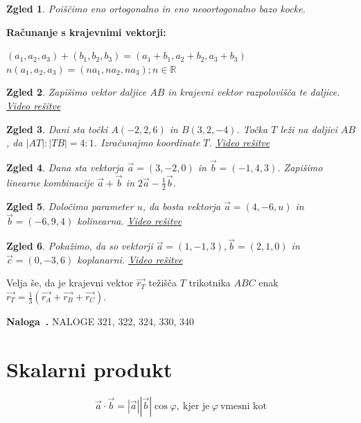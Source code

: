 \documentclass{article}
\newcounter{example}[section]
\newenvironment{example}[1][]{\refstepcounter{example}\par\medskip
   \noindent \textbf{Naloga~\theexample. #1} \rmfamily}{\medskip}
\newtheorem*{zgled}{Zgled}
\begin{document}
\begin{zgled}
    Poiščimo eno ortogonalno in eno neoortogonalno bazo kocke.
\end{zgled}

\textbf{Računanje s krajevnimi vektorji:}

$(a_1,a_2,a_3)+(b_1,b_2,b_3)=(a_1+b_1,a_2+b_2,a_3+b_3)$\\
$n(a_1,a_2,a_3)=(na_1,na_2,na_3); n\in \mathbb{R}$

\begin{zgled}
    Zapišimo vektor daljice $AB$ in krajevni vektor razpolovišča te daljice. \href{https://youtu.be/KS_ZTJiAqdY}{Video rešitve}
\end{zgled}
\begin{zgled}
    Dani sta točki $A(-2,2,6)$ in $B(3,2,-4)$. Točka $T$ leži na daljici $AB$, da $|AT|:|TB|=4:1$. Izračunajmo koordinate $T$.
    \href{https://youtu.be/I5FE3vhoatk}{Video rešitve}
\end{zgled}

\begin{zgled}
    Dana sta vektorja $\vec{a}=(3,-2,0)$ in $\vec{b}=(-1,4,3)$. Zapišimo linearne kombinacije $\vec{a}+\vec{b}$ in $2\vec{a}-\frac{1}{2}\vec{b}$.
\end{zgled}

\begin{zgled}
    Določimo parameter $u$, da bosta vektorja $\vec{a}=(4,-6,u)$ in $\vec{b}=(-6,9,4)$ kolinearna. \href{https://youtu.be/bGx1agtOIvw}{Video rešitve}
\end{zgled}

\begin{zgled}
    Pokažimo, da so vektorji $\vec{a}=(1,-1,3), \vec{b}=(2,1,0)$ in $\vec{c}=(0,-3,6)$ koplanarni. \href{https://youtu.be/-qfYWHrmi-8}{Video rešitve}
\end{zgled}

Velja še, da je krajevni vektor $\vec{r_T}$ težišča $T$ trikotnika $ABC$ enak $\vec{r_T}=\frac{1}{3}(\vec{r_A}+\vec{r_B}+\vec{r_C})$.

\begin{example}
    NALOGE 321, 322, 324, 330, 340
\end{example}

\section{Skalarni produkt}

\[\vec{a}\cdot\vec{b}=|\vec{a}||\vec{b}|\cos\varphi, \ \text{kjer je}\  \varphi \ \text{vmesni kot}\]
\end{document}
